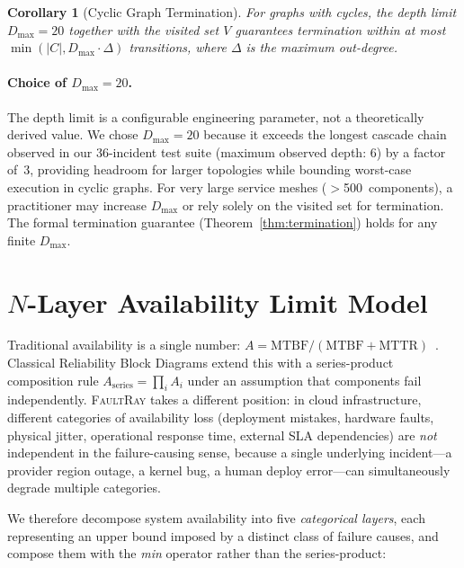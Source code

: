 \documentclass[10pt,twocolumn]{article}
\newtheorem{corollary}[theorem]{Corollary}
\begin{document}
\begin{corollary}[Cyclic Graph Termination]\label{cor:cyclic}
For graphs with cycles, the depth limit $D_{\max} = 20$ together with
the visited set $V$ guarantees termination within at most
$\min(|C|, D_{\max} \cdot \Delta)$ transitions, where $\Delta$ is
the maximum out-degree.
\end{corollary}

\paragraph{Choice of $D_{\max} = 20$.}
The depth limit is a configurable engineering parameter, not a
theoretically derived value. We chose $D_{\max} = 20$ because
it exceeds the longest cascade chain observed in our 36-incident
test suite (maximum observed depth: 6) by a factor of~3, providing
headroom for larger topologies while bounding worst-case execution
in cyclic graphs. For very large service meshes ($>$500~components),
a practitioner may increase $D_{\max}$ or rely solely on the
visited set for termination. The formal termination guarantee
(Theorem~\ref{thm:termination}) holds for any finite $D_{\max}$.

\section{$N$-Layer Availability Limit Model}\label{sec:availability}

Traditional availability is a single number:
$A = \text{MTBF} / (\text{MTBF} + \text{MTTR})$~\cite{trivedi2001}.
Classical Reliability Block Diagrams extend this with a
series-product composition rule
$A_{\text{series}} = \prod_i A_i$
under an assumption that components fail independently.
\textsc{FaultRay} takes a different position: in cloud infrastructure,
different categories of availability loss (deployment mistakes,
hardware faults, physical jitter, operational response time, external
SLA dependencies) are \emph{not} independent in the failure-causing
sense, because a single underlying incident---a provider region
outage, a kernel bug, a human deploy error---can simultaneously
degrade multiple categories.

We therefore decompose system availability into five
\emph{categorical layers}, each representing an upper bound imposed
by a distinct class of failure causes, and compose them with the
\emph{min} operator rather than the series-product:
\end{document}
